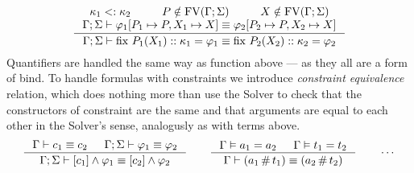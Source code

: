 \documentclass[english, mgr]{iithesis}
\begin{document}
$$
  \inference{
    \kind_1 \subkind \kind_2 &
    P \notin \fv[\Gamma; \Sigma] & \termv \notin \fv[\Gamma; \Sigma] \\
    \jgmnt[\Gamma; \Sigma]{\formphi_1[P_1 \mapsto P, \termv_1 \mapsto \termv] \equiv \formphi_2[P_2 \mapsto P, \termv_2 \mapsto \termv] }
    }{
    \jgmnt[\Gamma; \Sigma]{\fix{P_1}{\termv_1}{\kind_1}\formphi_1 \equiv \fix{P_2}{\termv_2}{\kind_2}\formphi_2}
  }
$$
Quantifiers are handled the same way as function above --- as they all are a form of bind.
To handle formulas with constraints we introduce \textit{constraint equivalence} relation,
which does nothing more than use the Solver to check that the constructors
of constraint are the same and that arguments are equal to each other in the Solver's sense,
analogusly as with terms above.
\\
$$
  \inference{
    \jgmnt[\Gamma]{\constr_1 \equiv \constr_2 } &
    \jgmnt[\Gamma; \Sigma]{\formphi_1 \equiv \formphi_2 }
  }{
    \jgmnt[\Gamma; \Sigma]{\fCAnd{\constr_1}\formphi_1 \equiv \fCAnd{\constr_2}\formphi_2 }
  }
\qquad
  \inference{
    \cjgmnt[\Gamma]{\atomv_1 \ceq \atomv_2 } & \cjgmnt[\Gamma]{\term_1 \ceq \term_2 }
  }{
    \jgmnt[\Gamma]{(\atomv_1 \cfresh \term_1) \equiv (\atomv_2 \cfresh \term_2) }
  }
\qquad
\cdots
$$

\end{document}
